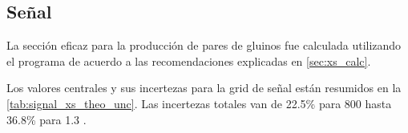 \subsection{Señal}\label{sec:syst_signal}

La sección eficaz para la producción de pares de gluinos  fue calculada utilizando
el programa {\nllfast} de acuerdo a las recomendaciones explicadas en \cref{sec:xs_calc}.



Los valores centrales y sus incertezas para la grid de señal están resumidos en
la \cref{tab:signal_xs_theo_unc}. Las incertezas totales van de 22.5\% para 800
{\GeV} hasta 36.8\% para 1.3 \tev.


